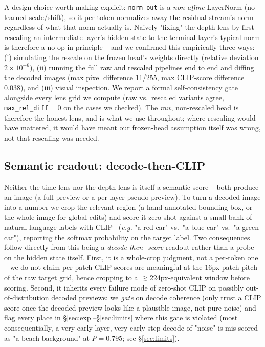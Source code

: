 \documentclass[10pt,twocolumn,letterpaper]{article}
\newcommand{\eg}{\emph{e.g.}}
\begin{document}
A design choice worth making explicit: \texttt{norm\_out} is a
\emph{non-affine} LayerNorm (no learned scale/shift), so it
per-token-normalizes away the residual stream's norm regardless of what
that norm actually is. Naively "fixing" the depth lens by first
rescaling an intermediate layer's hidden state to the terminal layer's
typical norm is therefore a no-op in principle -- and we confirmed this
empirically three ways: (i) simulating the rescale on the frozen head's
weights directly (relative deviation $2\times10^{-6}$), (ii) running the
full raw and rescaled pipelines end to end and diffing the decoded
images (max pixel difference 11/255, max CLIP-score difference 0.038),
and (iii) visual inspection. We report a formal self-consistency gate
alongside every lens grid we compute (raw vs.\ rescaled variants agree,
\texttt{max\_rel\_diff}$=0$ on the cases we checked). The \emph{raw},
non-rescaled head is therefore the honest lens, and is what we use
throughout; where rescaling would have mattered, it would have meant our
frozen-head assumption itself was wrong, not that rescaling was needed.

\subsection{Semantic readout: decode-then-CLIP}\label{sec:readout}
Neither the time lens nor the depth lens is itself a semantic score --
both produce an image (a full preview or a per-layer pseudo-preview).
To turn a decoded image into a number we crop the relevant region
(a hand-annotated bounding box, or the whole image for global edits) and
score it zero-shot against a small bank of natural-language labels with
CLIP~\citep{radford2021clip} (\eg{} "a red car" vs.\ "a blue car" vs.\ "a
green car"), reporting the softmax probability on the target label.
Two consequences follow directly from this being a \emph{decode-then-
score} readout rather than a probe on the hidden state itself. First, it
is a whole-crop judgment, not a per-token one -- we do not claim
per-patch CLIP scores are meaningful at the $16$px patch pitch of the raw
target grid, hence cropping to a $\gtrsim$224px-equivalent window before
scoring. Second, it inherits every failure mode of zero-shot CLIP on
possibly out-of-distribution decoded previews: we \emph{gate} on decode
coherence (only trust a CLIP score once the decoded preview looks like a
plausible image, not pure noise) and flag every place in
\S\ref{sec:exp}--\S\ref{sec:limits} where this gate is violated (most
consequentially, a very-early-layer, very-early-step decode of
"noise" is mis-scored as "a beach background" at $P{=}0.795$; see
\S\ref{sec:limits}).
\end{document}
